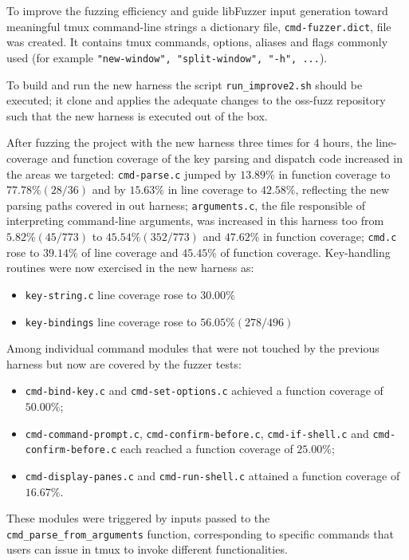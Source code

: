 \documentclass[11pt,a4paper,twocolumn]{article}
\begin{document}
To improve the fuzzing efficiency and guide libFuzzer input generation toward meaningful tmux command-line strings a dictionary file, \texttt{cmd-fuzzer.dict}, file was created. It contains tmux commands, options, aliases and flags commonly used (for example \texttt{"new-window", "split-window", "-h", ...}).

To build and run the new harness the script \texttt{run\_improve2.sh} should be executed; it clone and applies the adequate changes to the oss-fuzz repository such that the new harness is executed out of the box.

After fuzzing the project with the new harness three times for 4 hours, the line-coverage and function coverage of the key parsing and dispatch code increased in the areas we targeted: \texttt{cmd-parse.c} jumped by $13.89\%$ in function coverage to $77.78 \% (28/36)$ and by $15.63\%$ in line coverage to $42.58\%$, reflecting the new parsing paths covered in out harness; \texttt{arguments.c}, the file responsible of interpreting command‐line arguments, was increased in this harness too from $5.82\% (45/773)$ to $45.54 \% (352/773)$ and $47.62 \%$ in function coverage; \texttt{cmd.c} rose to $39.14 \%$ of line coverage and $45.45\%$ of function coverage. 
Key-handling routines were now exercised in the new harness as:
\begin{itemize}
    \item \texttt{key-string.c} line coverage rose to $30.00\%$
    \item \texttt{key-bindings} line coverage rose to $56.05\% (278/496)$ 
\end{itemize}

Among individual command modules that were not touched by the previous harness but now are covered by the fuzzer tests:
\begin{itemize}
    \item \texttt{cmd-bind-key.c} and \texttt{cmd-set-options.c} achieved a function coverage of $50.00\%$;
    \item \texttt{cmd-command-prompt.c}, \texttt{cmd-confirm-before.c}, \texttt{cmd-if-shell.c} and \texttt{cmd-confirm-before.c} each reached a function coverage of $25.00\%$;
    \item \texttt{cmd-display-panes.c} and \texttt{cmd-run-shell.c} attained a function coverage of $16.67\%$.    
\end{itemize}
These modules were triggered by inputs passed to the \texttt{cmd\_parse\_from\_arguments} function, corresponding to specific commands that users can issue in tmux to invoke different functionalities.
\end{document}
